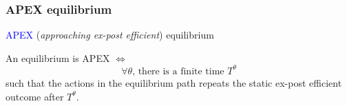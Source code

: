 \documentclass[8pt]{beamer}
\begin{document}
\begin{frame}
  \frametitle{APEX equilibrium}

\textcolor{blue}{APEX} (\textit{approaching ex-post efficient}) equilibrium

\begin{definition}
An equilibrium is APEX $\Leftrightarrow$ 
\[\text{$\forall\theta$,  there is a finite time $T^{\theta}$}\] 
such that the actions in the equilibrium path repeats the static ex-post efficient outcome after $T^{\theta}$. 
\end{definition}

\end{frame}
\end{document}
